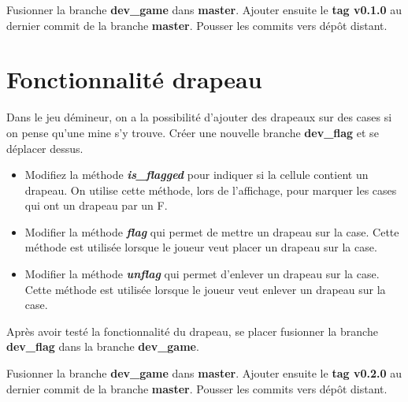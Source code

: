 Fusionner la branche \textbf{dev\_game} dans \textbf{master}. Ajouter ensuite le \textbf{tag v0.1.0} au dernier commit de la branche \textbf{master}. Pousser les commits vers dépôt distant.

\section{Fonctionnalité drapeau}
Dans le jeu démineur, on a la possibilité d'ajouter des drapeaux sur des cases si on pense qu'une mine s'y trouve. Créer une nouvelle branche \textbf{dev\_flag} et se déplacer dessus.
\medskip
\begin{itemize}
    \item Modifiez la méthode \textit{\textbf{is\_flagged}} pour indiquer si la cellule contient un drapeau. On utilise cette méthode, lors de l'affichage, pour marquer les cases qui ont un drapeau par un F.
    \medskip
    \item Modifier la méthode \textit{\textbf{flag}} qui permet de mettre un drapeau sur la case. Cette méthode est utilisée lorsque le joueur veut placer un drapeau sur la case.
    \medskip
    \item Modifier la méthode \textit{\textbf{unflag}} qui permet d'enlever un drapeau sur la case. Cette méthode est utilisée lorsque le joueur veut enlever un drapeau sur la case.
\end{itemize}

\medskip

Après avoir testé la fonctionnalité du drapeau, se placer fusionner la branche \textbf{dev\_flag} dans la branche \textbf{dev\_game}.

\medskip

Fusionner la branche \textbf{dev\_game} dans \textbf{master}. Ajouter ensuite le \textbf{tag v0.2.0} au dernier commit de la branche \textbf{master}. Pousser les commits vers dépôt distant.

